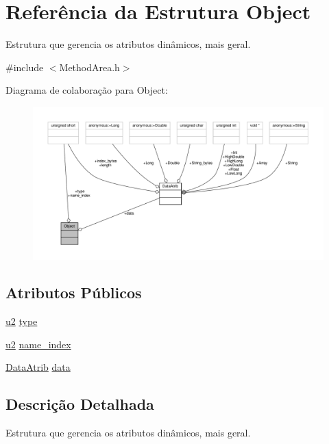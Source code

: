 \hypertarget{structObject}{}\section{Referência da Estrutura Object}
\label{structObject}


Estrutura que gerencia os atributos dinâmicos, mais geral.  




{\ttfamily \#include $<$Method\+Area.\+h$>$}



Diagrama de colaboração para Object\+:
\nopagebreak
\begin{figure}[H]
\begin{center}
\leavevmode
\includegraphics[width=350pt]{structObject__coll__graph}
\end{center}
\end{figure}
\subsection*{Atributos Públicos}
\begin{DoxyCompactItemize}
\item 
\hyperlink{ClassLoader_8h_a5f223212eef04d10a4550ded680cb1cf}{u2} \hyperlink{structObject_a0d3800016b59f53a98979f1c05a166f6}{type}
\item 
\hyperlink{ClassLoader_8h_a5f223212eef04d10a4550ded680cb1cf}{u2} \hyperlink{structObject_a792741be5e389dce8261c75ada556006}{name\+\_\+index}
\item 
\hyperlink{unionDataAtrib}{Data\+Atrib} \hyperlink{structObject_aea3a2d0f5d67e5b8e9259f02f2b744da}{data}
\end{DoxyCompactItemize}


\subsection{Descrição Detalhada}
Estrutura que gerencia os atributos dinâmicos, mais geral. 

